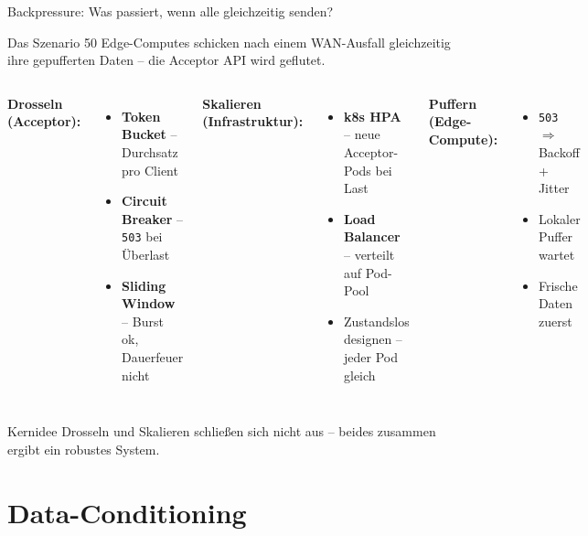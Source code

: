 \documentclass[aspectratio=169]{beamer}
\begin{document}
\begin{frame}{Backpressure: Was passiert, wenn alle gleichzeitig senden?}
  \begin{alertblock}{Das Szenario}
    50 Edge-Computes schicken nach einem WAN-Ausfall gleichzeitig
    ihre gepufferten Daten – die Acceptor API wird geflutet.
  \end{alertblock}
  \vspace{0.5em}
  \begin{columns}
      \textbf{Drosseln (Acceptor):}
      \begin{itemize}
        \item \textbf{Token Bucket} – Durchsatz pro Client
        \item \textbf{Circuit Breaker} – \texttt{503} bei Überlast
        \item \textbf{Sliding Window} – Burst ok, Dauerfeuer nicht
      \end{itemize}
      \textbf{Skalieren (Infrastruktur):}
      \begin{itemize}
        \item \textbf{k8s HPA} – neue Acceptor-Pods bei Last
        \item \textbf{Load Balancer} – verteilt auf Pod-Pool
        \item Zustandslos designen – jeder Pod gleich
      \end{itemize}
      \textbf{Puffern (Edge-Compute):}
      \begin{itemize}
        \item \texttt{503} $\Rightarrow$ Backoff + Jitter
        \item Lokaler Puffer wartet
        \item Frische Daten zuerst
      \end{itemize}
  \end{columns}
  \vspace{0.5em}
  \begin{exampleblock}{Kernidee}
    Drosseln und Skalieren schließen sich nicht aus –
    beides zusammen ergibt ein robustes System.
  \end{exampleblock}
\end{frame}

\section{Data-Conditioning}
\end{document}
